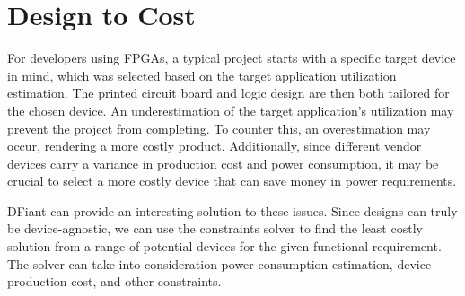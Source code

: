 \section{Design to Cost}
For developers using FPGAs, a typical project starts with a specific target device in mind, which was selected based on the target application utilization estimation. The printed circuit board and logic design are then both tailored for the chosen device. An underestimation of the target application's utilization may prevent the project from completing. To counter this, an overestimation may occur, rendering a more costly product. Additionally, since different vendor devices carry a variance in production cost and power consumption, it may be crucial to select a more costly device that can save money in power requirements. 

DFiant can provide an interesting solution to these issues. Since designs can truly be device-agnostic, we can use the constraints solver to find the least costly solution from a range of potential devices for the given functional requirement. The solver can take into consideration power consumption estimation, device production cost, and other constraints.